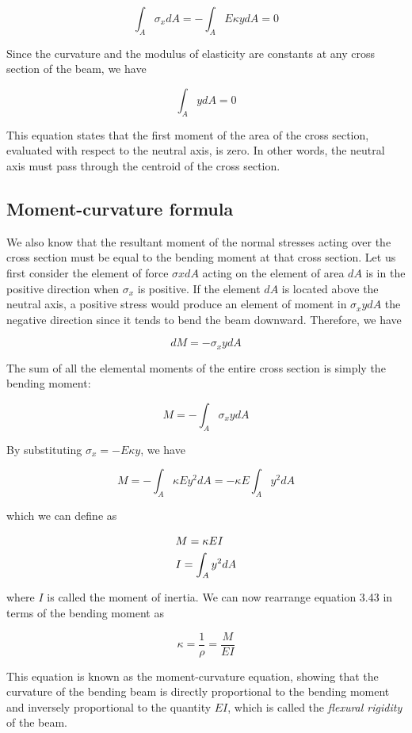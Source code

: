 \documentclass[a4paper,openany,12pt]{book}
\begin{document}
$$\int_A\sigma_x dA  =  - \int_A E\kappa ydA  = 0$$

Since the curvature and the modulus of elasticity are constants at any
cross section of the beam, we have

$$\int_A ydA = 0$$

This equation states that the first moment of the area of the cross
section, evaluated with respect to the neutral axis, is zero. In other
words, the neutral axis must pass through the centroid of the cross
section.

\subsection{Moment-curvature formula}
\label{sec:org61cc0e6}
We also know that the resultant moment of the normal stresses acting
over the cross section must be equal to the bending moment at that cross
section. Let us first consider the element of force \(\sigma xdA\) acting
on the element of area \(dA\) is in the positive direction when \(\sigma_x\)
is positive. If the element \(dA\) is located above the neutral axis, a
positive stress would produce an element of moment in \(\sigma_xydA\) the
negative direction since it tends to bend the beam downward. Therefore,
we have


$$dM =  - \sigma _xydA$$

The sum of all the elemental moments of the entire cross section is
simply the bending moment:

$$M =  - \int_A \sigma_xydA$$

By substituting \(\sigma_x = -E\kappa y\), we have

$$M =  - \int_A \kappa Ey^2dA  =  - \kappa E\int_A y^2dA$$

which we can define as

$$\begin{gathered}
  M = \kappa EI \hfill \\
  I = \int_A y^2dA  \hfill \\ 
\end{gathered}$$

where \(I\) is called the moment of inertia. We can now rearrange equation
3.43 in terms of the bending moment as

$$ \kappa  = \frac{1}{\rho } = \frac{M}{EI}$$

This equation is known as the moment-curvature equation, showing that
the curvature of the bending beam is directly proportional to the
bending moment and inversely proportional to the quantity \(EI\), which is
called the \emph{flexural rigidity} of the beam.
\end{document}
